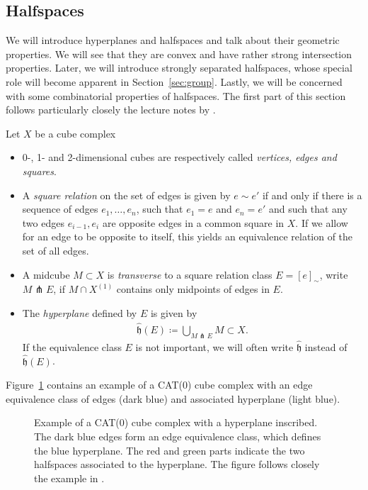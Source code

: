 \subsection{Halfspaces}
\label{sec:halfspaces}
We will introduce hyperplanes and halfspaces and talk about their geometric properties. We will see that they are convex and have rather strong intersection properties. Later, we will introduce strongly separated halfspaces, whose special role will become apparent in Section~\ref{sec:group}. Lastly, we will be concerned with some combinatorial properties of halfspaces. The first part of this section follows particularly closely the lecture notes by \textcite{Rolli2012}.

\begin{defin}[Hyperplanes]
  Let \(X\) be a cube complex
  \begin{itemize}
  \item 0-, 1- and 2-dimensional cubes are respectively called \emph{vertices, edges and squares}.
  \item A \emph{square relation} on the set of edges is given by \(e \sim e'\) if and only if there is a sequence of edges \(e_1, \dots, e_n\), such that \(e_1 = e\) and \(e_n = e'\) and such that any two edges \(e_{i-1}, e_i\) are opposite edges in a common square in \(X\). If we allow for an edge to be opposite to itself, this yields an equivalence relation of the set of all edges.
  \item A midcube \(M \subset X\) is \emph{transverse} to a square relation class \(E = [e]_\sim\), write \(M \pitchfork E\), if \(M \cap X^{(1)}\) contains only midpoints of edges in \(E\).
  \item The \emph{hyperplane} defined by \(E\) is given by
    \begin{align*}
      \mathfrak{\hat h}(E) \coloneqq \bigcup_{M \pitchfork E} M \subset X.
    \end{align*}
    If the equivalence class \(E\) is not important, we will often write \(\mathfrak{\hat h}\) instead of \(\mathfrak{\hat h}(E)\).
  \end{itemize}
\end{defin}

\begin{bsp}
  Figure~\ref{fig:hyperplanes} contains an example of a CAT(0) cube complex with an edge equivalence class of edges (dark blue) and associated hyperplane (light blue). 
  \begin{figure}[htbp]
    \centering
    
    \caption{Example of a CAT(0) cube complex with a hyperplane inscribed. The dark blue edges form an edge equivalence class, which defines the blue hyperplane. The red and green parts indicate the two halfspaces associated to the hyperplane. The figure follows closely the example in \textcite{sageev-lecture-notes}.}
    \label{fig:hyperplanes}
  \end{figure}
\end{bsp}

